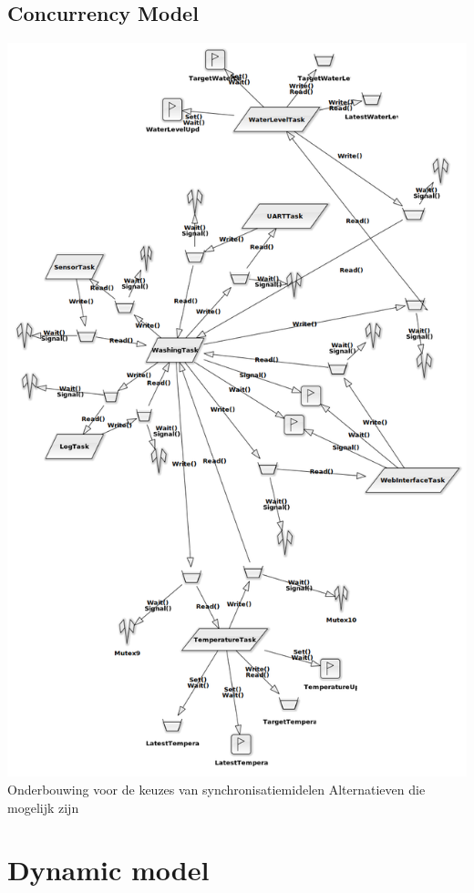 \newpage
	\begin{landscape}
		\section{Concurrency Model}
		\thispagestyle{empty}

		\includegraphics{Concurrencydiagram1.png}
		Onderbouwing voor de keuzes van synchronisatiemidelen
		Alternatieven die mogelijk zijn
	\end{landscape}

\newpage
	\section{Dynamic model}
